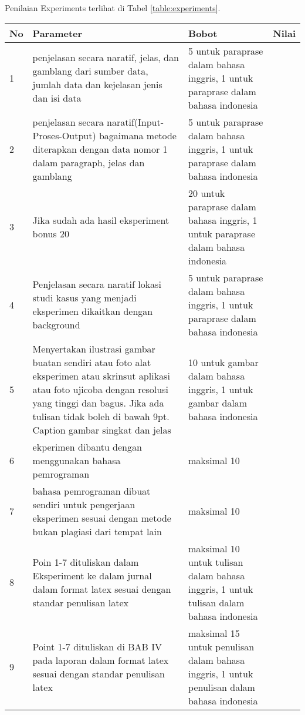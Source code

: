 Penilaian Experiments terlihat di Tabel \ref{table:experiments}.
\begin{longtable}{|p{}|p{}|p{}|p{}|}
\hline
No&Parameter&Bobot&Nilai\\
\hline

1 &penjelasan secara naratif, jelas, dan gamblang dari sumber data, jumlah data dan kejelasan jenis dan isi data&5 untuk paraprase dalam bahasa inggris, 1 untuk paraprase dalam bahasa indonesia& \\ \hline

2 &penjelasan secara naratif(Input-Proses-Output) bagaimana metode diterapkan dengan data nomor 1 dalam paragraph, jelas dan gamblang&5 untuk paraprase dalam bahasa inggris, 1 untuk paraprase dalam bahasa indonesia& \\ \hline

3 &Jika sudah ada hasil eksperiment bonus 20&20 untuk paraprase dalam bahasa inggris, 1 untuk paraprase dalam bahasa indonesia& \\ \hline

4 &Penjelasan secara naratif lokasi studi kasus yang menjadi eksperimen dikaitkan dengan background&5 untuk paraprase dalam bahasa inggris, 1 untuk paraprase dalam bahasa indonesia& \\ \hline

5 &Menyertakan ilustrasi gambar buatan sendiri atau foto alat eksperimen atau skrinsut aplikasi atau foto ujicoba dengan resolusi yang tinggi dan bagus. Jika ada tulisan tidak boleh di bawah 9pt. Caption gambar singkat dan jelas&10 untuk gambar dalam bahasa inggris, 1 untuk gambar dalam bahasa indonesia& \\ \hline

6 &ekperimen dibantu dengan menggunakan bahasa pemrograman&maksimal 10& \\ \hline

7 &bahasa pemrograman dibuat sendiri untuk pengerjaan eksperimen sesuai dengan metode bukan plagiasi dari tempat lain&maksimal 10& \\ \hline

8 &Poin 1-7 dituliskan dalam Eksperiment ke dalam jurnal dalam format latex sesuai dengan standar penulisan latex&maksimal 10 untuk tulisan dalam bahasa inggris, 1 untuk tulisan dalam bahasa indonesia& \\ \hline

9 &Point 1-7 dituliskan di BAB IV pada laporan dalam format latex sesuai dengan standar penulisan latex&maksimal 15 untuk penulisan dalam bahasa inggris, 1 untuk penulisan dalam bahasa indonesia& \\ \hline



\end{longtable}
